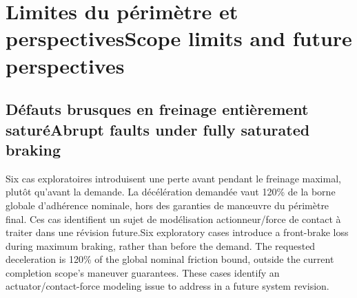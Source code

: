 \documentclass[11pt,a4paper,oneside]{report}
\newcommand{\bi}[2]{\iffrench #2\else #1\fi}
\newcommand{\chap}[2]{\chapter{\bi{#1}{#2}}}
\renewcommand{\sec}[2]{\section{\bi{#1}{#2}}}
\begin{document}
\chap{Scope limits and future perspectives}{Limites du périmètre et perspectives}
\sec{Abrupt faults under fully saturated braking}{Défauts brusques en freinage entièrement saturé}
\bi{Six exploratory cases introduce a front-brake loss during maximum braking, rather than before the demand. The requested deceleration is 120\% of the global nominal friction bound, outside the current completion scope's maneuver guarantees. These cases identify an actuator/contact-force modeling issue to address in a future system revision.}{Six cas exploratoires introduisent une perte avant pendant le freinage maximal, plutôt qu'avant la demande. La décélération demandée vaut 120\% de la borne globale d'adhérence nominale, hors des garanties de man\oe{}uvre du périmètre final. Ces cas identifient un sujet de modélisation actionneur/force de contact à traiter dans une révision future.}
\end{document}
